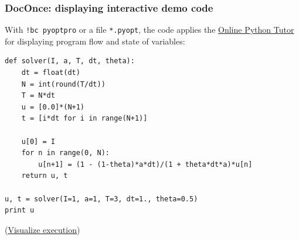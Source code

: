 \documentclass{beamer}
\begin{document}
\begin{frame}
\frametitle{DocOnce: displaying interactive demo code}

\label{slide:pot}

With \Verb?!bc pyoptpro? or a file \texttt{*.pyopt}, the code applies the
\href{{https://pythontutor.com}}{Online Python Tutor} for displaying
program flow and state of variables:
















\begin{verbatim}
def solver(I, a, T, dt, theta):
    dt = float(dt)
    N = int(round(T/dt))
    T = N*dt
    u = [0.0]*(N+1)
    t = [i*dt for i in range(N+1)]

    u[0] = I
    for n in range(0, N):
        u[n+1] = (1 - (1-theta)*a*dt)/(1 + theta*dt*a)*u[n]
    return u, t

u, t = solver(I=1, a=1, T=3, dt=1., theta=0.5)
print u

\end{verbatim}

\noindent
(\href{{https://pythontutor.com/visualize.html\#code=def+solver\%28I\%2C+a\%2C+T\%2C+dt\%2C+theta\%29\%3A\%0A++++dt+\%3D+float\%28dt\%29\%0A++++N+\%3D+int\%28round\%28T\%2Fdt\%29\%29\%0A++++T+\%3D+N\%2Adt\%0A++++u+\%3D+\%5B0.0\%5D\%2A\%28N\%2B1\%29\%0A++++t+\%3D+\%5Bi\%2Adt+for+i+in+range\%28N\%2B1\%29\%5D\%0A\%0A++++u\%5B0\%5D+\%3D+I\%0A++++for+n+in+range\%280\%2C+N\%29\%3A\%0A++++++++u\%5Bn\%2B1\%5D+\%3D+\%281+-+\%281-theta\%29\%2Aa\%2Adt\%29\%2F\%281+\%2B+theta\%2Adt\%2Aa\%29\%2Au\%5Bn\%5D\%0A++++return+u\%2C+t\%0A\%0Au\%2C+t+\%3D+solver\%28I\%3D1\%2C+a\%3D1\%2C+T\%3D3\%2C+dt\%3D1.\%2C+theta\%3D0.5\%29\%0Aprint+u&mode=display&cumulative=false&heapPrimitives=false&drawParentPointers=false&textReferences=false&py=2&curInstr=0}}{Visualize execution})
\end{frame}
\end{document}
